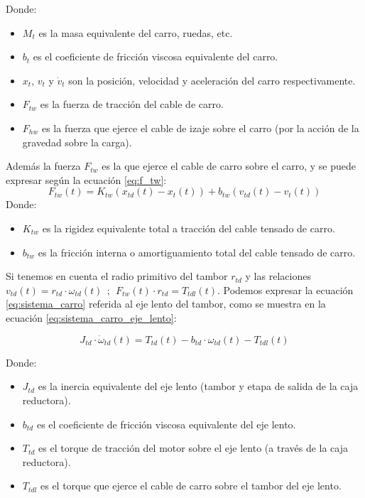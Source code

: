 \documentclass[11pt]{article}
\begin{document}
Donde:
\begin{itemize}
	\item $M_{t}$ es la masa equivalente del carro, ruedas, etc.
	\item $b_{t}$ es el coeficiente de fricción viscosa equivalente del carro.
	\item $x_{t}$, $v_{t}$ y $\dot{v}_{t}$ son la posición, velocidad y aceleración del carro respectivamente.
	\item $F_{tw}$ es la fuerza de tracción del cable de carro.
	\item $F_{hw}$ es la fuerza que ejerce el cable de izaje sobre el carro (por la acción de la gravedad sobre la carga).
\end{itemize}

Además la fuerza $F_{tw}$ es la que ejerce el cable de carro sobre el carro, y se puede expresar según la ecuación \ref{eq:f_tw}:
\begin{equation}
	\label{eq:f_tw}
	F_{tw}(t)=K_{tw}\left ( x_{td}(t) - x_{t}(t) \right ) + b_{tw}\left ( v_{td}(t) - v_{t}(t) \right )
\end{equation}
Donde:
\begin{itemize}
	\item $K_{tw}$ es la rigidez equivalente total a tracción del cable tensado de carro.
	\item $b_{tw}$ es la fricción interna o amortiguamiento total del cable tensado de carro.
\end{itemize}
Si tenemos en cuenta el radio primitivo del tambor $r_{td}$ y las relaciones $v_{td}(t)=r_{td}\cdot\omega_{td}(t)\ \ ;\ \ F_{tw}(t)\cdot r_{td} = T_{tdl}(t)$. Podemos expresar la ecuación \ref{eq:sistema_carro} referida al eje lento del tambor, como se muestra en la ecuación \ref{eq:sistema_carro_eje_lento}:

\begin{equation}
	\label{eq:sistema_carro_eje_lento}
	J_{td}\cdot \dot{\omega}_{td}(t)=T_{td}(t)-b_{td}\cdot\omega_{td}(t) - T_{tdl}(t)
\end{equation}

Donde:
\begin{itemize}
	\item $J_{td}$ es la inercia equivalente del eje lento (tambor y etapa de salida de la caja reductora).
	\item $b_{td}$ es el coeficiente de fricción viscosa equivalente del eje lento.
	\item $T_{td}$ es el torque de tracción del motor sobre el eje lento (a través de la caja reductora).
	\item $T_{tdl}$ es el torque que ejerce el cable de carro sobre el tambor del eje lento.
\end{itemize}
\end{document}
